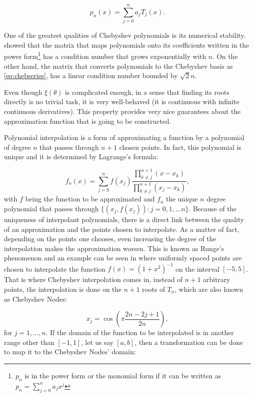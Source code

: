 \begin{equation}\label{eq:chebseries}
p_n(x) = \sum_{j=0}^{n} a_j T_j(x).
\end{equation}

One of the greatest qualities of Chebyshev polynomials is its numerical stability.  showed that the matrix that maps polynomials onto its coefficients written in the power form\footnote{$p_n$ is in the power form or the monomial form if it can be written as $p_n=\sum_{j=0}^{n}a_jx^j$} has a condition number that grows exponentially with $n$. On the other hand, the matrix that converts polynomials to the Chebyshev basis as \autoref{eq:chebseries}, has a linear condition number bounded by $\sqrt{2}n$.

Even though $\xi(\theta)$ is complicated enough, in a sense that finding its roots directly is no trivial task, it is very well-behaved (it is continuous with infinite continuous derivatives). This property provides very nice guarantees about the approximation function that is going to be constructed.

Polynomial interpolation is a form of approximating a function by a polynomial of degree $n$ that passes through $n+1$ chosen points. In fact, this polynomial is unique and it is determined by Lagrange's formula:

\begin{equation}\label{eq:lagrange}
f_n(x) = \sum_{j=0}^{n} f(x_j)\dfrac{\prod_{k \neq j}^{n+1} (x-x_k)}{\prod_{k \neq j}^{n+1} (x_j-x_k)},
\end{equation} 
with $f$ being the function to be approximated and $f_n$ the unique $n$ degree polynomial that passes through $\{(x_j, f(x_j)): j=0, 1, \dots n\}$. Because of the uniqueness of interpolant polynomials, there is a direct link between the quality of an approximation and the points chosen to interpolate. As a matter of fact, depending on the points one chooses, even increasing the degree of the interpolation makes the approximation worsen. This is known as Runge's phenomenon and an example can be seen in  where uniformly spaced points are chosen to interpolate the function $f(x) = (1+x^2)^{-1}$ on the interval $[-5, 5]$. That is where Chebyshev interpolation comes in, instead of $n+1$ arbitrary points, the interpolation is done on the $n+1$ roots of $T_n$, which are also known as Chebyshev Nodes:

\begin{equation}
x_j = \cos{\left(\pi\dfrac{2n-2j+1}{2n}\right)},
\end{equation}
for $j=1, \dots, n$. If the domain of the function to be interpolated is in another range other than $[-1, 1]$, let us say $[a, b]$, then a transformation can be done to map it to the Chebyshev Nodes' domain:

